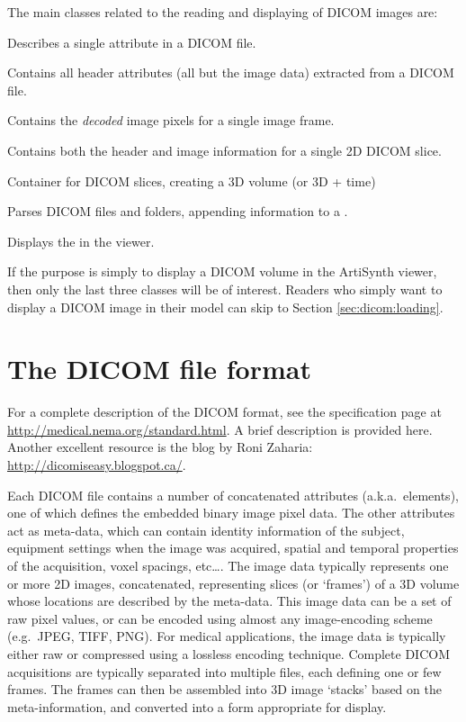The main classes related to the reading and displaying of DICOM images are:
\begin{lstdescription}
   \item[{\protect \javaclass[maspack.image.dicom]{DicomElement}}] Describes a single attribute in a DICOM file.
   \item[{\protect \javaclass[maspack.image.dicom]{DicomHeader}}] Contains all header attributes (all but the image data) extracted from a DICOM file.
   \item[{\protect \javaclass[maspack.image.dicom]{DicomPixelBuffer}}] Contains the \emph{decoded} image pixels for a single image frame.
   \item[{\protect \javaclass[maspack.image.dicom]{DicomSlice}}] Contains both the header and image information for a single 2D DICOM slice.
   \item[{\protect \javaclass[maspack.image.dicom]{DicomImage}}] Container for DICOM slices, creating a 3D volume (or 3D + time)
   \item[{\protect \javaclass[maspack.image.dicom]{DicomReader}}] Parses DICOM files and folders, appending information to a . 
   \item[{\protect \javaclass[artisynth.core.renderables]{DicomViewer}}] Displays the  in the viewer.
\end{lstdescription}
If the purpose is simply to display a DICOM volume in the ArtiSynth viewer, then only the last three classes will be of interest.  Readers who simply want to display a DICOM image in their model can skip to Section \ref{sec:dicom:loading}.

\section{The DICOM file format}

For a complete description of the DICOM format, see the specification page at \url{http://medical.nema.org/standard.html}.  A brief
description is provided here.  Another excellent resource is the blog by Roni Zaharia: \url{http://dicomiseasy.blogspot.ca/}.

Each DICOM file contains a number of concatenated attributes (a.k.a.~elements), one of which defines the embedded binary image pixel data.  The other attributes act as meta-data, which can contain identity information of the subject, equipment settings when the image was acquired, spatial and temporal properties of the acquisition, voxel spacings, etc\ldots.  The image data typically represents one or more 2D images, concatenated, representing slices (or `frames') of a 3D volume whose locations are described by the meta-data.  This image data can be a set of raw pixel values, or can be encoded using almost any image-encoding scheme (e.g.~JPEG, TIFF, PNG).  For medical applications, the image data is typically either raw or compressed using a lossless encoding technique.  Complete DICOM acquisitions are typically separated into multiple files, each defining one or few frames.  The frames can then be assembled into 3D image `stacks' based on the meta-information, and converted into a form appropriate for display.

